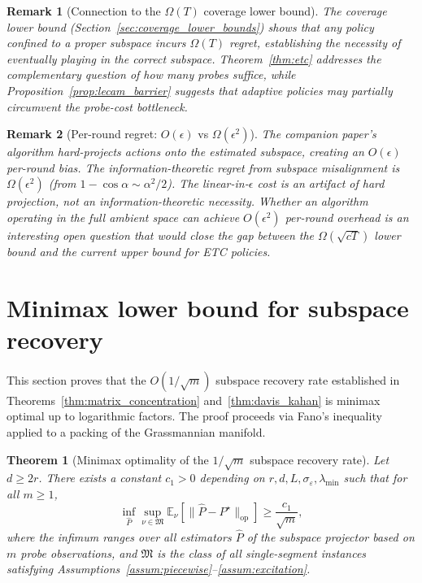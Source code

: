 \documentclass[12pt]{article}
\newcommand{\E}{\mathbb{E}}
\newcommand{\op}{\mathrm{op}}
\newtheorem{theorem}{Theorem}
\newtheorem{remark}{Remark}
\theoremstyle{plain}
\theoremstyle{definition}
\begin{document}
\begin{remark}[Connection to the $\Omega(T)$ coverage lower bound]
\label{rem:coverage_connection}
The coverage lower bound (Section~\ref{sec:coverage_lower_bounds}) shows that any policy confined to a proper subspace incurs $\Omega(T)$ regret, establishing the necessity of eventually playing in the correct subspace. Theorem~\ref{thm:etc} addresses the complementary question of how many probes suffice, while Proposition~\ref{prop:lecam_barrier} suggests that adaptive policies may partially circumvent the probe-cost bottleneck.
\end{remark}

\begin{remark}[Per-round regret: $O(\epsilon)$ vs $\Omega(\epsilon^2)$]
\label{rem:eps_scaling}
The companion paper's algorithm hard-projects actions onto the estimated subspace, creating an $O(\epsilon)$ per-round bias. The information-theoretic regret from subspace misalignment is $\Omega(\epsilon^2)$ (from $1 - \cos\alpha \sim \alpha^2/2$). The linear-in-$\epsilon$ cost is an artifact of hard projection, not an information-theoretic necessity. Whether an algorithm operating in the full ambient space can achieve $O(\epsilon^2)$ per-round overhead is an interesting open question that would close the gap between the $\Omega(\sqrt{cT})$ lower bound and the current upper bound for ETC policies.
\end{remark}


\section{Minimax lower bound for subspace recovery}
\label{sec:minimax_subspace}

This section proves that the $O(1/\sqrt{m})$ subspace recovery rate established in Theorems~\ref{thm:matrix_concentration} and~\ref{thm:davis_kahan} is minimax optimal up to logarithmic factors. The proof proceeds via Fano's inequality applied to a packing of the Grassmannian manifold.

\begin{theorem}[Minimax optimality of the $1/\sqrt{m}$ subspace recovery rate]
\label{thm:minimax_subspace}
Let $d \ge 2r$. There exists a constant $c_1 > 0$ depending on $r, d, L, \sigma_\varepsilon, \lambda_{\min}$ such that for all $m \ge 1$,
\[
\inf_{\widehat{P}} \sup_{\nu \in \mathfrak{M}}
\E_\nu\!\left[\|\widehat{P} - P^\star\|_{\op}\right]
\ge \frac{c_1}{\sqrt{m}},
\]
where the infimum ranges over all estimators $\widehat{P}$ of the subspace projector based on $m$ probe observations, and $\mathfrak{M}$ is the class of all single-segment instances satisfying Assumptions~\ref{assum:piecewise}--\ref{assum:excitation}.
\end{theorem}
\end{document}
